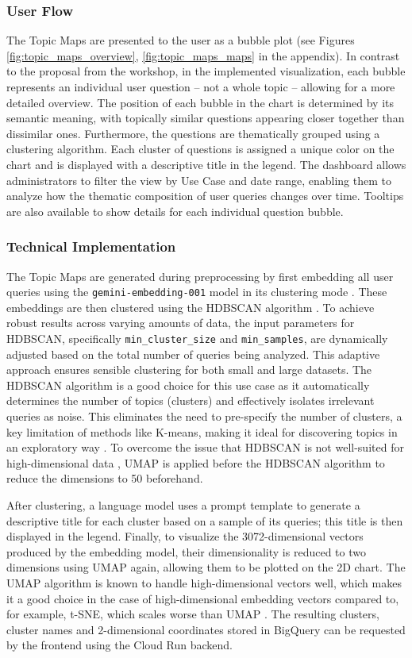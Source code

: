 \documentclass[
	english,
	ruledheaders=section,%
	class=report,%
	thesis={type=bachelor},%
	accentcolor=1b,%
	custommargins=true,%
	marginpar=false,%
	parskip=half-,%
	fontsize=11pt,%
	DIV=14,
]{tudapub}
\begin{document}
\subsubsection{User Flow}
The Topic Maps are presented to the user as a bubble plot (see Figures \ref{fig:topic_maps_overview},  \ref{fig:topic_maps_maps} in the appendix). In contrast to the proposal from the workshop, in the implemented visualization, each bubble represents an individual user question -- not a whole topic -- allowing for a more detailed overview. The position of each bubble in the chart is determined by its semantic meaning, with topically similar questions appearing closer together than dissimilar ones. Furthermore, the questions are thematically grouped using a clustering algorithm. Each cluster of questions is assigned a unique color on the chart and is displayed with a descriptive title in the legend. The dashboard allows administrators to filter the view by Use Case and date range, enabling them to analyze how the thematic composition of user queries changes over time. Tooltips are also available to show details for each individual question bubble.
\subsubsection{Technical Implementation}
The Topic Maps are generated during preprocessing by first embedding all user queries using the \texttt{gemini-embedding-001} model in its clustering mode \parencite{GoogleEmbedding001}. These embeddings are then clustered using the HDBSCAN algorithm \parencite{Malzer2021}. To achieve robust results across varying amounts of data, the input parameters for HDBSCAN, specifically \texttt{min\_cluster\_size} and \texttt{min\_samples}, are dynamically adjusted based on the total number of queries being analyzed. This adaptive approach ensures sensible clustering for both small and large datasets. The HDBSCAN algorithm is a good choice for this use case as it automatically determines the number of topics (clusters) and effectively isolates irrelevant queries as noise. This eliminates the need to pre-specify the number of clusters, a key limitation of methods like K-means, making it ideal for discovering topics in an exploratory way \parencite[p.~5]{Baligodugula2025}. To overcome the issue that HDBSCAN is not well-suited for high-dimensional data \parencite[p.~5]{Baligodugula2025}, UMAP \parencite{McInnes2020} is applied before the HDBSCAN algorithm to reduce the dimensions to 50 beforehand.

After clustering, a language model uses a prompt template to generate a descriptive title for each cluster based on a sample of its queries; this title is then displayed in the legend. Finally, to visualize the 3072-dimensional vectors produced by the embedding model, their dimensionality is reduced to two dimensions using UMAP again, allowing them to be plotted on the 2D chart. The UMAP algorithm is known to handle high-dimensional vectors well, which makes it a good choice in the case of high-dimensional embedding vectors compared to, for example, t-SNE, which scales worse than UMAP \parencite[pp.~51]{McInnes2020}.
The resulting clusters, cluster names and 2-dimensional coordinates stored in BigQuery can be requested by the frontend using the Cloud Run backend.
\end{document}
